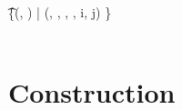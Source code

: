 \begin{pcvstack}[boxed]
\begin{pchstack}
\begin{pcvstack}
{                \t \pcreturn \{(\cred, \usk) | (\cred, \cm, , \usk, i, j) \in \CRED\}\\
                \pcreturn \bot \\
            }
        \end{pcvstack}
        \begin{pcvstack}
        \end{pcvstack}
    \end{pchstack}
\end{pcvstack}






























\newpage
\section{Construction}


